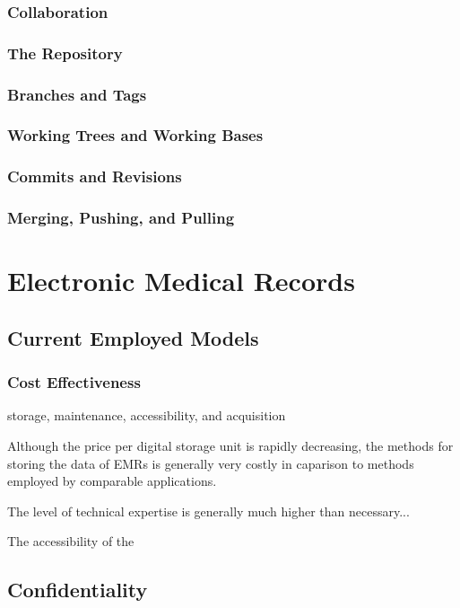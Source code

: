 \documentclass{acm_proc_article-sp}
\begin{document}
\subsubsection{Collaboration}
\subsubsection{The Repository}
\subsubsection{Branches and Tags}
\subsubsection{Working Trees and Working Bases}
\subsubsection{Commits and Revisions}
\subsubsection{Merging, Pushing, and Pulling}

\section{Electronic Medical Records}
\subsection{Current Employed Models}
\subsubsection{Cost Effectiveness}

storage, maintenance, accessibility, and acquisition

Although the price per digital storage unit is rapidly decreasing, the methods for storing 
the data of EMRs is generally very costly in caparison to methods employed by comparable 
applications.  

The level of technical expertise is generally much higher than necessary...

The accessibility of the 

\subsection{Confidentiality}
\end{document}
